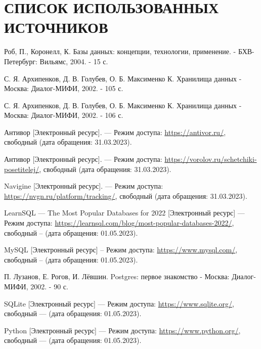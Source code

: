 \section*{СПИСОК ИСПОЛЬЗОВАННЫХ ИСТОЧНИКОВ}
\begingroup
\renewcommand{\section}[2]{}
\begin{thebibliography}{}
	
	Роб, П., Коронелл, К. Базы данных: концепции, технологии, применение. -
	БХВ-Петербург: Вильямс, 2004. - 15 с.

    С. Я. Архипенков, Д. В. Голубев, О. Б. Максименко К. Хранилища данных -
    Москва: Диалог-МИФИ, 2002. - 105 с.

    С. Я. Архипенков, Д. В. Голубев, О. Б. Максименко К. Хранилища данных -
    Москва: Диалог-МИФИ, 2002. - 106 с.


    Антивор [Электронный ресурс]. --- Режим доступа: \url{https://antivor.ru/},
    свободный (дата обращения: 31.03.2023).

    Антивор [Электронный ресурс]. --- Режим доступа:
    \url{https://vorolov.ru/schetchiki-posetitelej/}, свободный (дата
    обращения:
    31.03.2023).

    Navigine [Электронный ресурс]. --- Режим доступа:
    \url{https://nvgn.ru/platform/tracking/}, свободный (дата обращения:
    31.03.2023).

    LearnSQL --- The Most Popular Databases for 2022 [Электронный ресурс]
    --- Режим доступа:
    \url{https://learnsql.com/blog/most-popular-databases-2022/}, свободный --
    (дата обращения: 01.05.2023).

    MySQL [Электронный ресурс] -- Режим доступа: \url{https://www.mysql.com/},
    свободный -- (дата обращения: 01.05.2023).

    П. Лузанов, Е. Рогов, И. Лёвшин. Postgres: первое знакомство -
    Москва: Диалог-МИФИ, 2002. - 90 с.


    SQLite [Электронный ресурс] --- Режим доступа:
    \url{https://www.sqlite.org/}, свободный --- (дата обращения: 01.05.2023).

    Python [Электронный ресурс] --- Режим доступа:
    \url{https://www.python.org/}, свободный --- (дата обращения: 01.05.2023).


\end{thebibliography}
